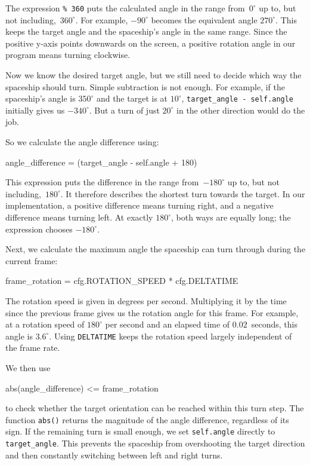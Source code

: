 The expression \texttt{\% 360} puts the calculated angle in the range from~$0^\circ$ up to, but not including,~$360^\circ$. For example, $-90^\circ$ becomes the equivalent angle $270^\circ$. This keeps the target angle and the spaceship's angle in the same range. Since the positive y-axis points downwards on the screen, a positive rotation angle in our program means turning clockwise.

Now we know the desired target angle, but we still need to decide which way the spaceship should turn. Simple subtraction is not enough. For example, if the spaceship's angle is $350^\circ$ and the target is at $10^\circ$, \texttt{target\_angle - self.angle} initially gives us $-340^\circ$. But a turn of just $20^\circ$ in the other direction would do the job.

So we calculate the angle difference using:
\begin{codebox}
	angle_difference = (target_angle - self.angle + 180) %
\end{codebox}

This expression puts the difference in the range from~$-180^\circ$ up to, but not including,~$180^\circ$. It therefore describes the shortest turn towards the target. In our implementation, a positive difference means turning right, and a negative difference means turning left. At exactly $180^\circ$, both ways are equally long; the expression chooses $-180^\circ$.

Next, we calculate the maximum angle the spaceship can turn through during the current frame:
\begin{codebox}
	frame_rotation = cfg.ROTATION_SPEED * cfg.DELTATIME
\end{codebox}

The rotation speed is given in degrees per second. Multiplying it by the time since the previous frame gives us the rotation angle for this frame. For example, at a rotation speed of $180^\circ$ per second and an elapsed time of $0.02$~seconds, this angle is $3.6^\circ$. Using \texttt{DELTATIME} keeps the rotation speed largely independent of the frame rate.

We then use
\begin{codebox}
	abs(angle_difference) <= frame_rotation
\end{codebox}
to check whether the target orientation can be reached within this turn step. The function \texttt{abs()} returns the magnitude of the angle difference, regardless of its sign. If the remaining turn is small enough, we set \texttt{self.angle} directly to \texttt{target\_angle}. This prevents the spaceship from overshooting the target direction and then constantly switching between left and right turns.

